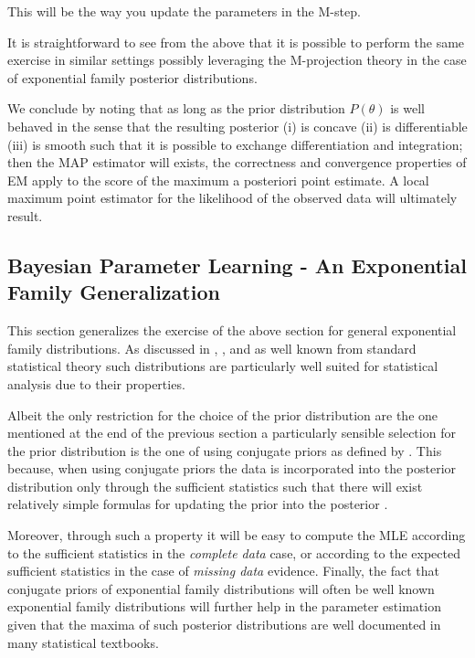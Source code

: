 \documentclass[11pt]{article}
\begin{document}
\begin{article}
This will be the way you update the parameters in the M-step.

It is straightforward to see from the above that it is possible to
perform the same exercise in similar settings possibly leveraging
the M-projection theory in the case of exponential family posterior
distributions. 

We conclude by noting that as long as the prior distribution
\(P(\theta)\) is well behaved in the sense that the resulting
posterior (i) is concave (ii) is differentiable (iii) is smooth
such that it is possible to exchange differentiation and
integration; then the MAP estimator will exists, the correctness
and convergence properties of EM apply to the score of the maximum
a posteriori point estimate. A local maximum point estimator for
the likelihood of the observed data will ultimately result.

\subsection{Bayesian Parameter Learning - An Exponential Family Generalization}
\label{sec:org229dfc6}

This section generalizes the exercise of the above section for
general exponential family distributions. As discussed in
\cite{barndorff1978hyperbolic}, \cite{geiger1998asymptotic},
\cite{lauritzen1996graphical} and as well known from standard
statistical theory such distributions are particularly well suited
for statistical analysis due to their properties. 

Albeit the only restriction for the choice of the prior
distribution are the one mentioned at the end of the previous
section a particularly sensible selection for the prior
distribution is the one of using conjugate priors as defined by
\cite{schlaifer1961applied}. This because, when using conjugate
priors the data is incorporated into the posterior distribution
only through the sufficient statistics such that there will exist
relatively simple formulas for updating the prior into the
posterior \cite{fink1997compendium}.

Moreover, through such a property it will be easy to compute the
MLE according to the sufficient statistics in the \emph{complete data}
case, or according to the expected sufficient statistics in the
case of \emph{missing data} evidence. Finally, the fact that conjugate
priors of exponential family distributions will often be well
known exponential family distributions will further help in the
parameter estimation given that the maxima of such posterior
distributions are well documented in many statistical textbooks.


\end{article}
\end{document}

